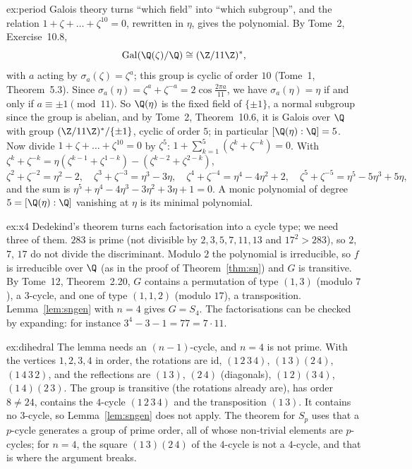 \begin{solution}{ex:period}
\idea Galois theory turns ``which field'' into ``which subgroup'', and the relation $1+\zeta+\dots+\zeta^{10}=0$, rewritten in $\eta$, gives the polynomial.
\writeup By Tome~2, Exercise~10.8,
\[
\operatorname{Gal}(\Q(\zeta)/\Q)\cong(\Z/11\Z)^*,
\]
with $a$ acting by $\sigma_a(\zeta)=\zeta^a$; this group is cyclic of order $10$ (Tome~1, Theorem~5.3). Since $\sigma_a(\eta)=\zeta^a+\zeta^{-a}=2\cos\frac{2\pi a}{11}$, we have $\sigma_a(\eta)=\eta$ if and only if
$a\equiv\pm1\pmod{11}$. So $\Q(\eta)$ is the fixed field of $\{\pm1\}$, a normal subgroup since the group is abelian, and by Tome~2, Theorem~10.6, it is
Galois over $\Q$ with group $(\Z/11\Z)^*/\{\pm1\}$, cyclic of order $5$; in particular $[\Q(\eta):\Q]=5$. Now divide $1+\zeta+\dots+\zeta^{10}=0$ by
$\zeta^5$: $1+\sum_{k=1}^5(\zeta^k+\zeta^{-k})=0$. With $\zeta^k+\zeta^{-k}=\eta(\zeta^{k-1}+\zeta^{1-k})-(\zeta^{k-2}+\zeta^{2-k})$,
\[
\zeta^2+\zeta^{-2}=\eta^2-2,\quad\zeta^3+\zeta^{-3}=\eta^3-3\eta,\quad\zeta^4+\zeta^{-4}=\eta^4-4\eta^2+2,\quad\zeta^5+\zeta^{-5}=\eta^5-5\eta^3+5\eta,
\]
and the sum is $\eta^5+\eta^4-4\eta^3-3\eta^2+3\eta+1=0$. A monic polynomial of degree $5=[\Q(\eta):\Q]$ vanishing at $\eta$ is its minimal polynomial.
\end{solution}

\begin{solution}{ex:x4}
\idea Dedekind's theorem turns each factorisation into a cycle type; we need three of them.
\writeup $283$ is prime (not divisible by $2,3,5,7,11,13$ and $17^2>283$), so $2$, $7$, $17$ do not divide the discriminant. Modulo $2$ the polynomial is
irreducible, so $f$ is irreducible over $\Q$ (as in the proof of Theorem~\ref{thm:sn}) and $G$ is transitive. By Tome~12, Theorem~2.20, $G$ contains a
permutation of type $(1,3)$ (modulo $7$), a $3$-cycle, and one of type $(1,1,2)$ (modulo $17$), a transposition. Lemma~\ref{lem:sngen} with $n=4$ gives
$G=S_4$. The factorisations can be checked by expanding: for instance $3^4-3-1=77=7\cdot11$.
\end{solution}

\begin{solution}{ex:dihedral}
\idea The lemma needs an $(n-1)$-cycle, and $n=4$ is not prime.
\writeup With the vertices $1,2,3,4$ in order, the rotations are $\mathrm{id}$, $(1\,2\,3\,4)$, $(1\,3)(2\,4)$, $(1\,4\,3\,2)$, and the reflections are
$(1\,3)$, $(2\,4)$ (diagonals), $(1\,2)(3\,4)$, $(1\,4)(2\,3)$. The group is transitive (the rotations already are), has order $8\ne24$, contains the
$4$-cycle $(1\,2\,3\,4)$ and the transposition $(1\,3)$. It contains no $3$-cycle, so Lemma~\ref{lem:sngen} does not apply. The theorem for $S_p$ uses that
a $p$-cycle generates a group of prime order, all of whose non-trivial elements are $p$-cycles; for $n=4$, the square $(1\,3)(2\,4)$ of the $4$-cycle is
not a $4$-cycle, and that is where the argument breaks.
\end{solution}

